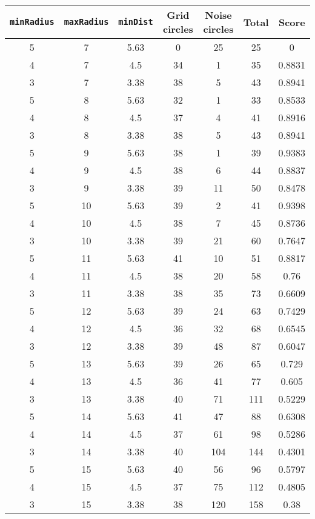 \documentclass[letterpaper, 12pt]{article}
\begin{document}
\begin{longtable}{|c|c|c|c|c|c|c|}
\hline
\textbf{\texttt{minRadius}} & \textbf{\texttt{maxRadius}} & \textbf{\texttt{minDist}} & \textbf{Grid circles} & \textbf{Noise circles} & \textbf{Total} & \textbf{Score} \\
\hline
5 & 7 & 5.63 & 0 & 25 & 25 & 0 \\
\hline
4 & 7 & 4.5 & 34 & 1 & 35 & 0.8831 \\
\hline
3 & 7 & 3.38 & 38 & 5 & 43 & 0.8941 \\
\hline
5 & 8 & 5.63 & 32 & 1 & 33 & 0.8533 \\
\hline
4 & 8 & 4.5 & 37 & 4 & 41 & 0.8916 \\
\hline
3 & 8 & 3.38 & 38 & 5 & 43 & 0.8941 \\
\hline
5 & 9 & 5.63 & 38 & 1 & 39 & 0.9383 \\
\hline
4 & 9 & 4.5 & 38 & 6 & 44 & 0.8837 \\
\hline
3 & 9 & 3.38 & 39 & 11 & 50 & 0.8478 \\
\hline
5 & 10 & 5.63 & 39 & 2 & 41 & 0.9398 \\
\hline
4 & 10 & 4.5 & 38 & 7 & 45 & 0.8736 \\
\hline
3 & 10 & 3.38 & 39 & 21 & 60 & 0.7647 \\
\hline
5 & 11 & 5.63 & 41 & 10 & 51 & 0.8817 \\
\hline
4 & 11 & 4.5 & 38 & 20 & 58 & 0.76 \\
\hline
3 & 11 & 3.38 & 38 & 35 & 73 & 0.6609 \\
\hline
5 & 12 & 5.63 & 39 & 24 & 63 & 0.7429 \\
\hline
4 & 12 & 4.5 & 36 & 32 & 68 & 0.6545 \\
\hline
3 & 12 & 3.38 & 39 & 48 & 87 & 0.6047 \\
\hline
5 & 13 & 5.63 & 39 & 26 & 65 & 0.729 \\
\hline
4 & 13 & 4.5 & 36 & 41 & 77 & 0.605 \\
\hline
3 & 13 & 3.38 & 40 & 71 & 111 & 0.5229 \\
\hline
5 & 14 & 5.63 & 41 & 47 & 88 & 0.6308 \\
\hline
4 & 14 & 4.5 & 37 & 61 & 98 & 0.5286 \\
\hline
3 & 14 & 3.38 & 40 & 104 & 144 & 0.4301 \\
\hline
5 & 15 & 5.63 & 40 & 56 & 96 & 0.5797 \\
\hline
4 & 15 & 4.5 & 37 & 75 & 112 & 0.4805 \\
\hline
3 & 15 & 3.38 & 38 & 120 & 158 & 0.38 \\

\end{longtable}
\end{document}
